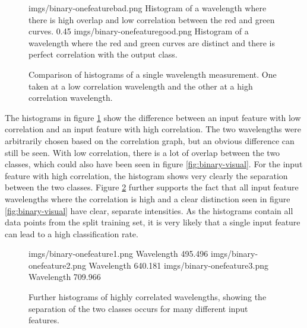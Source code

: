 \documentclass{article}
\begin{document}
\begin{figure}[H]
\centering
{}
{imgs/binary-onefeaturebad.png}
{Histogram of a wavelength where there is high overlap and low correlation between the red and green curves.}
\hspace*{\fill}
\subfigureimage
{0.45\textwidth}
{imgs/binary-onefeaturegood.png}
{Histogram of a wavelength where the red and green curves are distinct and there is perfect correlation with the output class.}

\caption{Comparison of histograms of a single wavelength measurement. One taken at a low correlation wavelength and the other at a high correlation wavelength.}
\label{fig:binary-histogram-comparison}
\end{figure}
\noindent
The histograms in figure \ref{fig:binary-histogram-comparison} show the difference between an input feature with low correlation and an input feature with high correlation. The two wavelengths were arbitrarily chosen based on the correlation graph, but an obvious difference can still be seen. With low correlation, there is a lot of overlap between the two classes, which could also have been seen in figure \ref{fig:binary-visual}. For  the input feature with high correlation, the histogram shows very clearly the separation between the two classes. Figure \ref{fig:binary-histogram-more} further supports the fact that all input feature wavelengths where the correlation is high and a clear distinction seen in figure \ref{fig:binary-visual} have clear, separate intensities. As the histograms contain all data points from the split training set, it is very likely that a single input feature can lead to a high classification rate. 

\begin{figure}[H]
{imgs/binary-onefeature1.png}
{Wavelength 495.496}
\hspace*{\fill}
{imgs/binary-onefeature2.png}
{Wavelength 640.181}
\hspace*{\fill}
{imgs/binary-onefeature3.png}
{Wavelength 709.966}
\caption{Further histograms of highly correlated wavelengths, showing the separation of the two classes occurs for many different input features.}
\label{fig:binary-histogram-more}
\end{figure}
\end{document}
